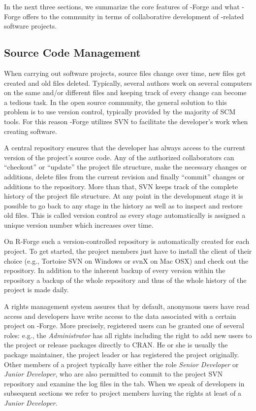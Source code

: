 In the next three sections, we summarize the core features of
\R{}-Forge and what \R{}-Forge offers to the \R{} community in terms
of  collaborative development of \R{}-related software projects.

\subsection{Source Code Management}

When carrying out software projects, source files change over time,
new files get created and old files deleted. Typically, several authors
work on several computers on the same and/or different files and keeping
track of every change can become a tedious task. In the open source
community, the general solution to this problem is to use version
control, typically 
provided by the majority of SCM tools. For this reason \R{}-Forge
utilizes SVN to facilitate the developer's work when creating
software.

A central repository ensures that the developer
has always access to the current version of the project's source
code. Any of the authorized collaborators can ``checkout'' or
``update'' the project
file structure, make the necessary changes or additions, delete
files from the current revision and finally ``commit'' changes or additions
to the repository. More than
that, SVN keeps track of the complete history of the project file
structure. At any point in the development stage it is possible to go
back to any stage in the history as well as to inspect and restore old
files. This is called version control as every stage automatically is
assigned a unique version number which increases over time. 

On R-Forge such a version-controlled repository is automatically
created for each project. To get started, the project members just
have to install the client of their choice (e.g., Tortoise SVN on
Windows or svnX on 
Mac OSX) and check out the repository. In addition to the inherent
backup of every version within the repository a backup of the whole
repository and thus of the whole history of the project is made daily. 

A rights management system assures that by default, anonymous users
have read access and developers have write access to the data associated with 
a certain project on \R{}-Forge. More precisely, registered users can
be granted one of several roles: e.g., the \textit{Administrator} has
all rights including the right to 
add new users to the project or release packages directly to CRAN. He
or she is usually the package 
maintainer, the project leader or has registered the project originally.
Other members of a project typically have either the role \textit{Senior 
Developer} or \textit{Junior Developer}, who  are also permitted to
commit to the project  
SVN repository and examine the log files in the  tab.
When we speak of developers in subsequent sections we refer to project
members having the rights at least of a \textit{Junior Developer}.


